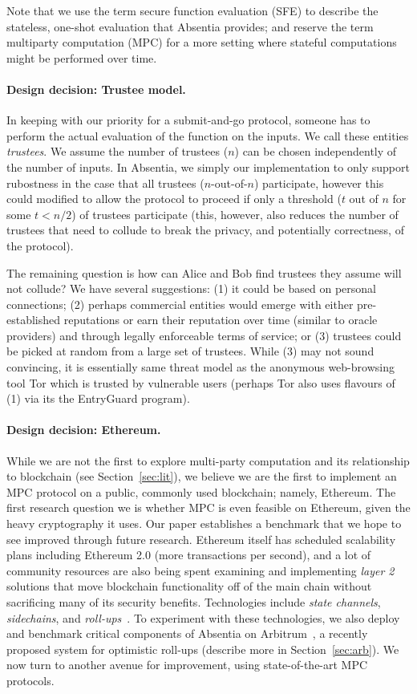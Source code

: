 Note that we use the term secure function evaluation (SFE) to describe the stateless, one-shot evaluation that Absentia provides; and reserve the term multiparty computation (MPC) for a more setting where stateful computations might be performed over time.

\paragraph{Design decision: Trustee model.} In keeping with our priority for a submit-and-go protocol, someone has to perform the actual evaluation of the function on the inputs. We call these entities \emph{trustees}. We assume the number of trustees ($n$) can be chosen independently of the number of inputs. In Absentia, we simply our implementation to only support rubostness in the case that all trustees ($n$-out-of-$n$) participate, however this could modified to allow the protocol to proceed if only a threshold ($t$ out of $n$ for some $t<n/2$) of trustees participate (this, however, also reduces the number of trustees that need to collude to break the privacy, and potentially correctness, of the protocol).  

The remaining question is how can Alice and Bob find trustees they assume will not collude? We have several suggestions: (1) it could be based on personal connections; (2) perhaps commercial entities would emerge with either pre-established reputations or earn their reputation over time (similar to oracle providers) and through legally enforceable terms of service; or (3) trustees could be picked at random from a large set of trustees. While (3) may not sound convincing, it is essentially same threat model as the anonymous web-browsing tool Tor which is trusted by vulnerable users (perhaps Tor also uses flavours of (1) via its the EntryGuard program). 

\paragraph{Design decision: Ethereum.} While we are not the first to explore multi-party computation and its relationship to blockchain (see Section~\ref{sec:lit}), we believe we are the first to implement an MPC protocol on a public, commonly used blockchain; namely, Ethereum. The first research question we is whether MPC is even feasible on Ethereum, given the heavy cryptography it uses. Our paper establishes a benchmark that we hope to see improved through future research. Ethereum itself has scheduled scalability plans including Ethereum 2.0 (more transactions per second), and a lot of community resources are also being spent examining and implementing \emph{layer 2} solutions that move blockchain functionality off of the main chain without sacrificing many of its security benefits. Technologies include \emph{state channels}, \emph{sidechains}, and \emph{roll-ups}~\cite{GMR+20}. To experiment with these technologies, we also deploy and benchmark critical components of Absentia on Arbitrum~\cite{KGCWF18}, a recently proposed system for optimistic roll-ups (describe more in Section~\ref{sec:arb}). We now turn to another avenue for improvement, using state-of-the-art MPC protocols.

